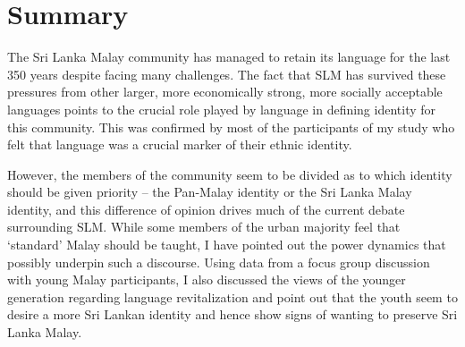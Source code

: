 \section{Summary}

The Sri Lanka Malay community has managed to retain its language for the last 350 years despite facing many challenges. The fact that SLM has survived these pressures from other larger, more economically strong, more socially acceptable languages points to the crucial role played by language in defining identity for this community. This was confirmed by most of the participants of my study who felt that language was a crucial marker of their ethnic identity.

However, the members of the community seem to be divided as to which identity should be given priority -- the Pan-Malay identity or the Sri Lanka Malay identity, and this difference of opinion drives much of the current debate surrounding SLM. While some members of the urban majority feel that `standard' Malay should be taught, I have pointed out the power dynamics that possibly underpin such a discourse. Using data from a focus group discussion with young Malay participants, I also discussed the views of the younger generation regarding language revitalization and point out that the youth seem to desire a more Sri Lankan identity and hence show signs of wanting to preserve Sri Lanka Malay. 

\nocite{DeumertEtAlEd2006}
